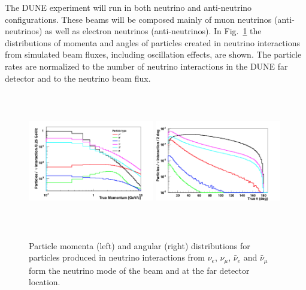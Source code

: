 The DUNE experiment will run in both neutrino and anti-neutrino 
configurations. These beams will be composed  mainly of muon neutrinos (anti-neutrinos) as well as electron neutrinos (anti-neutrinos). In Fig.~\ref{fig:particle_momenta} the distributions of momenta and angles of particles created in neutrino interactions from 
simulated beam fluxes, including oscillation effects, are shown. The particle rates are normalized  to the number of neutrino interactions in the DUNE far detector and to the neutrino beam flux.
\begin{figure}[h!]
  \centering
\includegraphics[width=0.49\textwidth,height=6.0cm]{figures/True_Momenta_per_Particle_9_2_1_0_logy_logx} 
\includegraphics[width=0.49\textwidth,height=6.0cm]{figures/True_theta_per_Particle_9_2_1_0_lin}
  \caption{Particle momenta (left) and angular (right) distributions for particles produced in neutrino interactions 
from $\nu_e$, $\nu_\mu$, $\bar \nu_e$ and $\bar \nu_\mu$ form the neutrino mode of the beam and at the far detector location.
}
\label{fig:particle_momenta}
\end{figure}


